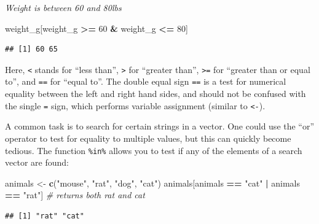 \documentclass[
]{article}
\newenvironment{Shaded}{\begin{snugshade}}{\end{snugshade}}
\newcommand{\CommentTok}[1]{\textcolor[rgb]{0.56,0.35,0.01}{\textit{#1}}}
\newcommand{\DecValTok}[1]{\textcolor[rgb]{0.00,0.00,0.81}{#1}}
\newcommand{\KeywordTok}[1]{\textcolor[rgb]{0.13,0.29,0.53}{\textbf{#1}}}
\newcommand{\NormalTok}[1]{#1}
\newcommand{\OperatorTok}[1]{\textcolor[rgb]{0.81,0.36,0.00}{\textbf{#1}}}
\newcommand{\StringTok}[1]{\textcolor[rgb]{0.31,0.60,0.02}{#1}}
\begin{document}
\emph{Weight is between 60 and 80lbs}

\begin{Shaded}
\begin{Highlighting}[]
\NormalTok{weight_g[weight_g }\OperatorTok{>=}\StringTok{ }\DecValTok{60} \OperatorTok{&}\StringTok{ }\NormalTok{weight_g }\OperatorTok{<=}\StringTok{ }\DecValTok{80}\NormalTok{]}
\end{Highlighting}
\end{Shaded}

\begin{verbatim}
## [1] 60 65
\end{verbatim}

Here, \texttt{\textless{}} stands for ``less than'',
\texttt{\textgreater{}} for ``greater than'', \texttt{\textgreater{}=}
for ``greater than or equal to'', and \texttt{==} for ``equal to''. The
double equal sign \texttt{==} is a test for numerical equality between
the left and right hand sides, and should not be confused with the
single \texttt{=} sign, which performs variable assignment (similar to
\texttt{\textless{}-}).

A common task is to search for certain strings in a vector. One could
use the ``or'' operator \texttt{\textbar{}} to test for equality to
multiple values, but this can quickly become tedious. The function
\texttt{\%in\%} allows you to test if any of the elements of a search
vector are found:

\begin{Shaded}
\begin{Highlighting}[]
\NormalTok{animals <-}\StringTok{ }\KeywordTok{c}\NormalTok{(}\StringTok{"mouse"}\NormalTok{, }\StringTok{"rat"}\NormalTok{, }\StringTok{"dog"}\NormalTok{, }\StringTok{"cat"}\NormalTok{)}
\NormalTok{animals[animals }\OperatorTok{==}\StringTok{ "cat"} \OperatorTok{|}\StringTok{ }\NormalTok{animals }\OperatorTok{==}\StringTok{ "rat"}\NormalTok{] }\CommentTok{# returns both rat and cat}
\end{Highlighting}
\end{Shaded}

\begin{verbatim}
## [1] "rat" "cat"
\end{verbatim}

\begin{Shaded}
\end{Shaded}
\end{document}
